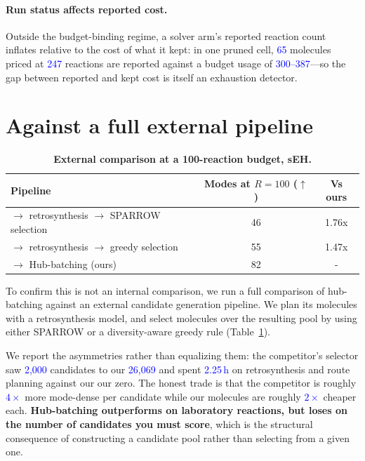 \documentclass{article}
\newcommand{\checkval}[1]{\textcolor{blue}{#1}}
\begin{document}
\paragraph{Run status affects reported cost.}
Outside the budget-binding regime, a solver arm's reported reaction count inflates relative to the cost of what it kept: in one pruned cell, \checkval{65} molecules priced at \checkval{247} reactions are reported against a budget usage of \checkval{300--387}---so the gap between reported and kept cost is itself an exhaustion detector.

\section{Against a full external pipeline}
\label{app:external}
\begin{table}[t]
\centering
\caption{\textbf{External comparison at a 100-reaction budget, sEH.}}
\label{tab:external}
\small
\begin{tabular}{lcc}
\toprule
Pipeline & Modes at $R=100$ ($\uparrow$) & Vs ours \\
\midrule
\citet{kim2026s3gfn} $\to$ retrosynthesis $\to$ SPARROW selection & 46 & 1.76x \\
\citet{kim2026s3gfn} $\to$ retrosynthesis $\to$ greedy selection & 55 & 1.47x \\
\citet{gainski2026scent} $\to$ Hub-batching (ours) & 82 & - \\
\bottomrule
\end{tabular}
\end{table}

To confirm this is not an internal comparison, we run a full comparison of hub-batching against an external candidate generation pipeline. We plan its molecules with a retrosynthesis model, and select molecules over the resulting pool by using either SPARROW or a diversity-aware greedy rule (Table~\ref{tab:external}).


We report the asymmetries rather than equalizing them: the competitor's selector saw \checkval{2,000} candidates to our \checkval{26{,}069} and spent \checkval{2.25\,h} on retrosynthesis and route planning against our our zero. The honest trade is that the competitor is roughly \checkval{$4\times$} more mode-dense per candidate while our molecules are roughly \checkval{$2\times$} cheaper each. \textbf{Hub-batching outperforms on laboratory reactions, but loses on the number of candidates you must score}, which is the structural consequence of constructing a candidate pool rather than selecting from a given one.
\end{document}
